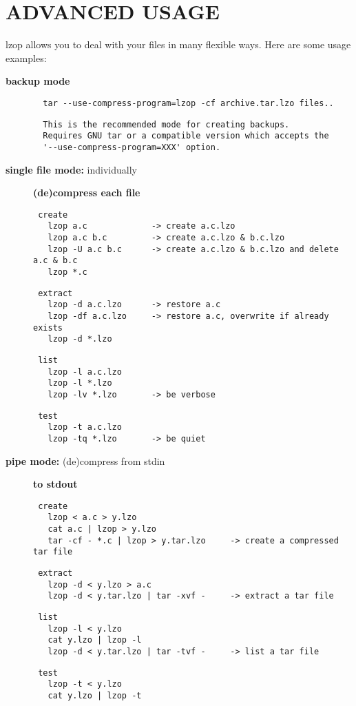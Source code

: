 \section{ADVANCED USAGE\label{ADVANCED_USAGE}}


lzop allows you to deal with your files in many flexible
ways. Here are some usage examples:

\begin{description}

\item[{\textbf{backup mode}}] \mbox{}\begin{verbatim}
  tar --use-compress-program=lzop -cf archive.tar.lzo files..
\end{verbatim}
\begin{verbatim}
  This is the recommended mode for creating backups.
  Requires GNU tar or a compatible version which accepts the
  '--use-compress-program=XXX' option.
\end{verbatim}

\item[{\textbf{single file mode:} individually}] \textbf{(de)compress each file}\begin{verbatim}
 create
   lzop a.c             -> create a.c.lzo
   lzop a.c b.c         -> create a.c.lzo & b.c.lzo
   lzop -U a.c b.c      -> create a.c.lzo & b.c.lzo and delete a.c & b.c
   lzop *.c
\end{verbatim}
\begin{verbatim}
 extract
   lzop -d a.c.lzo      -> restore a.c
   lzop -df a.c.lzo     -> restore a.c, overwrite if already exists
   lzop -d *.lzo
\end{verbatim}
\begin{verbatim}
 list
   lzop -l a.c.lzo
   lzop -l *.lzo
   lzop -lv *.lzo       -> be verbose
\end{verbatim}
\begin{verbatim}
 test
   lzop -t a.c.lzo
   lzop -tq *.lzo       -> be quiet
\end{verbatim}

\item[{\textbf{pipe mode:} (de)compress from stdin}] \textbf{to stdout}\begin{verbatim}
 create
   lzop < a.c > y.lzo
   cat a.c | lzop > y.lzo
   tar -cf - *.c | lzop > y.tar.lzo     -> create a compressed tar file
\end{verbatim}
\begin{verbatim}
 extract
   lzop -d < y.lzo > a.c
   lzop -d < y.tar.lzo | tar -xvf -     -> extract a tar file
\end{verbatim}
\begin{verbatim}
 list
   lzop -l < y.lzo
   cat y.lzo | lzop -l
   lzop -d < y.tar.lzo | tar -tvf -     -> list a tar file
\end{verbatim}
\begin{verbatim}
 test
   lzop -t < y.lzo
   cat y.lzo | lzop -t
\end{verbatim}


\end{description}

